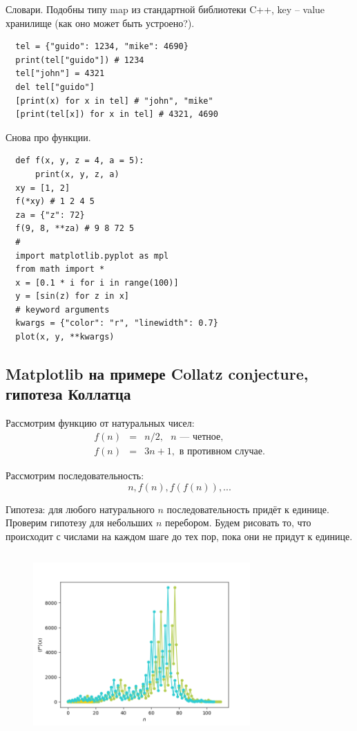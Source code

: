 \documentclass{book}
\begin{document}
Словари. Подобны типу map из стандартной библиотеки C++, key -- value хранилище (как оно может быть
устроено?).
\begin{verbatim}
  tel = {"guido": 1234, "mike": 4690}
  print(tel["guido"]) # 1234
  tel["john"] = 4321
  del tel["guido"]
  [print(x) for x in tel] # "john", "mike"
  [print(tel[x]) for x in tel] # 4321, 4690
\end{verbatim}

Снова про функции.
\begin{verbatim}
  def f(x, y, z = 4, a = 5):
      print(x, y, z, a)
  xy = [1, 2]
  f(*xy) # 1 2 4 5
  za = {"z": 72}
  f(9, 8, **za) # 9 8 72 5
  #
  import matplotlib.pyplot as mpl
  from math import *
  x = [0.1 * i for i in range(100)]
  y = [sin(z) for z in x]
  # keyword arguments
  kwargs = {"color": "r", "linewidth": 0.7}
  plot(x, y, **kwargs)
\end{verbatim}

\subsection{Matplotlib на примере Collatz conjecture, гипотеза Коллатца}

Рассмотрим функцию от натуральных чисел:
\begin{eqnarray}
    f(n) & = & n / 2, \text{ $n$ --- четное}, \\
    f(n) & = & 3 n + 1, \text{ в противном случае}.
\end{eqnarray}

Рассмотрим последовательность:
\begin{equation}
  n, f(n), f(f(n)), ...
\end{equation}

Гипотеза: для любого натурального $n$ последовательность придёт к единице.
Проверим гипотезу для небольших $n$ перебором. Будем рисовать то, что происходит с числами на
каждом шаге до тех пор, пока они не придут к единице.

\inputminted{python}{collatz.py}

\begin{figure}[p]
  \centering
  \includegraphics[width=8.3cm]{collatz.png}
\end{figure}
\end{document}
